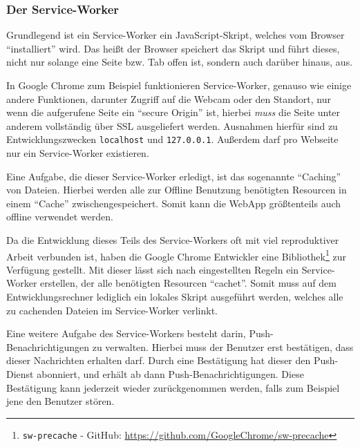 \documentclass[a4paper,12pt]{scrartcl}      %
\providecommand{\inlinecode}[1]{\texttt{#1}}
\begin{document}
	\subsubsection{Der Service-Worker}
	Grundlegend ist ein Service-Worker ein JavaScript-Skript, welches vom Browser ``installiert'' wird. Das heißt der Browser speichert das Skript und führt dieses, nicht nur solange eine Seite bzw. Tab offen ist, sondern auch darüber hinaus, aus.\par
	In Google Chrome zum Beispiel funktionieren Service-Worker, genauso wie einige andere Funktionen, darunter Zugriff auf die Webcam oder den Standort, nur wenn die aufgerufene Seite ein ``secure Origin'' ist, hierbei \emph{muss} die Seite unter anderem vollständig über SSL ausgeliefert werden. Ausnahmen hierfür sind zu Entwicklungszwecken \inlinecode{localhost} und \inlinecode{127.0.0.1}. Außerdem darf pro Webseite nur ein Service-Worker existieren.\par
	Eine Aufgabe, die dieser Service-Worker erledigt, ist das sogenannte ``Caching'' von Dateien. Hierbei werden alle zur Offline Benutzung benötigten Resourcen in einem ``Cache'' zwischengespeichert. Somit kann die WebApp größtenteils auch offline verwendet werden.\par
	Da die Entwicklung dieses Teils des Service-Workers oft mit viel reproduktiver Arbeit verbunden ist, haben die Google Chrome Entwickler eine Bibliothek\footnote{\inlinecode{sw-precache} - GitHub: \url{https://github.com/GoogleChrome/sw-precache}} zur Verfügung gestellt. Mit dieser lässt sich nach eingestellten Regeln ein Service-Worker erstellen, der alle benötigten Resourcen ``cachet''. Somit muss auf dem Entwicklungsrechner lediglich ein lokales Skript ausgeführt werden, welches alle zu cachenden Dateien im Service-Worker verlinkt.\par
	Eine weitere Aufgabe des Service-Workers besteht darin, Push-Benachrichtigungen zu verwalten. Hierbei muss der Benutzer erst bestätigen, dass dieser Nachrichten erhalten darf. Durch eine Bestätigung hat dieser den Push-Dienst abonniert, und erhält ab dann Push-Benachrichtigungen. Diese Bestätigung kann jederzeit wieder zurückgenommen werden, falls zum Beispiel jene den Benutzer stören.\par
	
\end{document}
